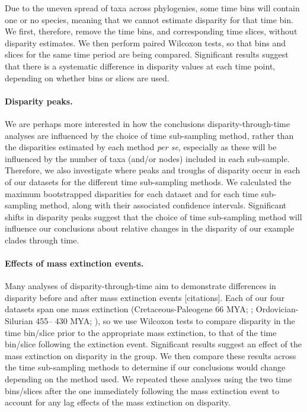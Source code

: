 \documentclass[12pt,a4paper]{article}
\begin{document}
Due to the uneven spread of taxa across phylogenies, some time bins will contain one or no species, meaning that we cannot estimate disparity for that time bin. 
We first, therefore, remove the time bins, and corresponding time slices, without disparity estimates. 
We then perform paired Wilcoxon tests, so that bins and slices for the same time period are being compared. 
Significant results suggest that there is a systematic difference in disparity values at each time point, depending on whether bins or slices are used.

\paragraph{Disparity peaks.}
We are perhaps more interested in how the conclusions disparity-through-time analyses are influenced by the choice of time sub-sampling method, rather than the disparities estimated by each method \textit{per se}, especially as these will be influenced by the number of taxa (and/or nodes) included in each sub-sample. 
Therefore, we also investigate where peaks and troughs of disparity occur in each of our datasets for the different time sub-sampling methods. 
We calculated the maximum bootstrapped disparities for each dataset and for each time sub-sampling method, along with their associated confidence intervals.
Significant shifts in disparity peaks suggest that the choice of time sub-sampling method will influence our conclusions about relative changes in the disparity of our example clades through time. 

\paragraph{Effects of mass extinction events.}
Many analyses of disparity-through-time aim to demonstrate differences in disparity before and after mass extinction events [citations]. 
Each of our four datasets span one mass extinction (Cretaceous-Paleogene 66 MYA; \citealt{brusatte2014gradual,bapst2016topology,beckancient2014}; Ordovician-Silurian 455– 430 MYA; \citealt{wright2017bayesian}), so we use Wilcoxon tests to compare disparity in the time bin/slice prior to the appropriate mass extinction, to that of the time bin/slice following the extinction event. 
Significant results suggest an effect of the mass extinction on disparity in the group.
We then compare these results across the time sub-sampling methods to determine if our conclusions would change depending on the method used.
We repeated these analyses using the two time bins/slices after the one immediately following the mass extinction event to account for any lag effects of the mass extinction on disparity.
\end{document}
